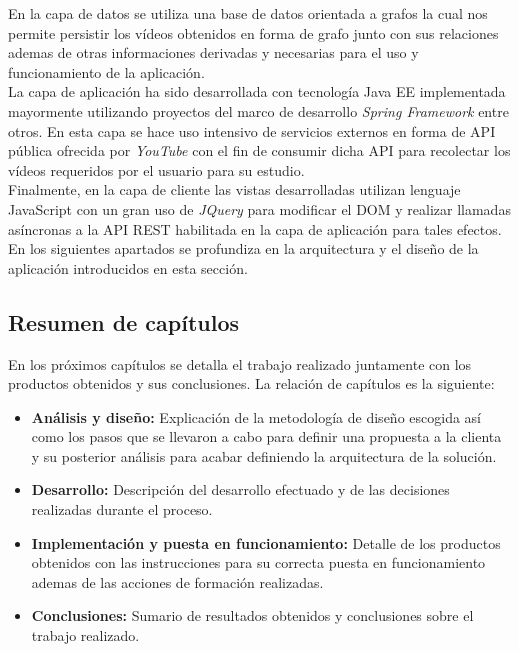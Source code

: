 \documentclass[11pt,a4paper]{article}
\begin{document}
En la capa de datos se utiliza una base de datos orientada a grafos \cite{10} la cual nos permite persistir los vídeos obtenidos en forma de grafo junto con sus relaciones ademas de otras informaciones derivadas y necesarias para el uso y funcionamiento de la aplicación.
\\

La capa de aplicación ha sido desarrollada con tecnología Java EE \cite{11} implementada mayormente utilizando proyectos del marco de desarrollo \textit{Spring Framework} \cite{12} entre otros. En esta capa se hace uso intensivo de servicios externos en forma de API pública ofrecida por \textit{YouTube} con el fin de consumir dicha API para recolectar los vídeos requeridos por el usuario para su estudio.
\\

Finalmente, en la capa de cliente las vistas desarrolladas utilizan lenguaje JavaScript \cite{13} con un gran uso de \textit{JQuery} \cite{14} para modificar el DOM y realizar llamadas asíncronas a la API REST habilitada en la capa de aplicación para tales efectos.
\\

En los siguientes apartados se profundiza en la arquitectura y el diseño de la aplicación introducidos en esta sección.
\medskip 

\subsection{Resumen de capítulos}
En los próximos capítulos se detalla el trabajo realizado juntamente con los productos obtenidos y sus conclusiones. La relación de capítulos es la siguiente:

\begin{itemize}
\item \textbf{Análisis y diseño:} Explicación de la metodología de diseño escogida así como los pasos que se llevaron a cabo para definir una propuesta a la clienta y su posterior análisis para acabar definiendo la arquitectura de la solución.
\item \textbf{Desarrollo:} Descripción del desarrollo efectuado y de las decisiones realizadas durante el proceso.
\item \textbf{Implementación y puesta en funcionamiento:} Detalle de los productos obtenidos con las instrucciones para su correcta puesta en funcionamiento ademas de las acciones de formación realizadas.
\item \textbf{Conclusiones:} Sumario de resultados obtenidos y conclusiones sobre el trabajo realizado.
\end{itemize}
\end{document}

